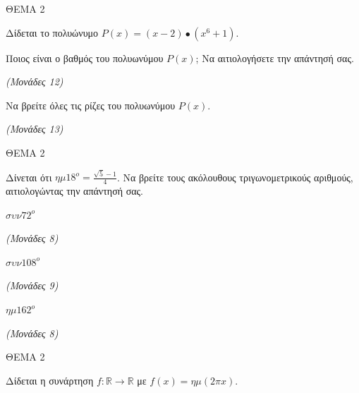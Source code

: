 \documentclass[11pt,a4paper,twoside]{book}
\newcommand{\monades}[1]{\hfill \textit{(Μονάδες #1)}}
\begin{document}
ΘΕΜΑ 2

Δίδεται το πολυώνυμο $P(x) = (x - 2) \bullet (x^{6} + 1)$.

\begin{alist}
\item Ποιος είναι ο βαθμός του πολυωνύμου $P(x)$; Να αιτιολογήσετε την απάντησή σας.

\monades{12}

\item Να βρείτε όλες τις ρίζες του πολυωνύμου $P(x)$.

\monades{13}
\end{alist}

\vspace{4mm}

ΘΕΜΑ 2

Δίνεται ότι $\eta\mu 18^{ο} = \frac{\sqrt{5} - 1}{4}$. Να βρείτε τους ακόλουθους τριγωνομετρικούς αριθμούς, αιτιολογώντας την απάντησή σας.

\begin{alist}
\item $\sigma\upsilon\nu 72^{ο}$

\monades{8}

\item $\sigma\upsilon\nu 108^{ο}$

\monades{9}

\item $\eta\mu 162^{ο}$

\monades{8}
\end{alist}

\vspace{4mm}

ΘΕΜΑ 2

Δίδεται η συνάρτηση $f:\mathbb{R \rightarrow R}$ με $f(x) = \eta\mu(2\pi x)$.
\end{document}
